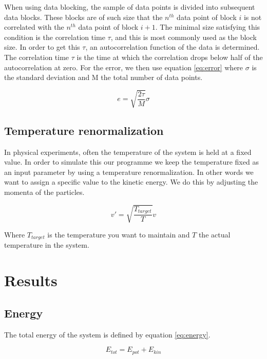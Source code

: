 \documentclass[a4paper,twoside,12pt]{article}
\begin{document}
\noindent When using data blocking, the sample of data points is divided into subsequent data blocks. These blocks are of such size that the $n^{th}$ data point of block $i$ is not correlated with the $n^{th}$ data point of block $i+1$. The minimal size satisfying this condition is the correlation time $\tau$, and this is most commonly used as the block size. In order to get this $\tau$, an autocorrelation function of the data is determined. The correlation time $\tau$ is the time at which the correlation drops below half of the autocorrelation at zero. For the error, we then use equation \ref{eq:error} where $\sigma$ is the standard deviation and M the total number of data points.

\begin{equation}
e = \sqrt{\frac{2\tau}{M}}\sigma
\label{eq:error}
\end{equation}

\subsection{Temperature renormalization}\label{sec:tem}

\noindent In physical experiments, often the temperature of the system is held at a fixed value. In order to simulate this our programme we keep the temperature fixed as an input parameter by using a temperature renormalization.
In other words we want to assign a specific value to the kinetic energy. We do this by adjusting the momenta of the particles.

\begin{equation}
v'= \sqrt{\frac{T_{target}}{T}}v
\end{equation}

\noindent Where $T_{target}$ is the temperature you want to maintain and $T$ the actual temperature in the system. 


\section{Results}

\subsection{Energy}

\noindent The total energy of the system is defined by equation \ref{eq:energy}.

\begin{equation}
E_{tot}=E_{pot}+E_{kin}
\label{eq:energy}
\end{equation}
\end{document}
